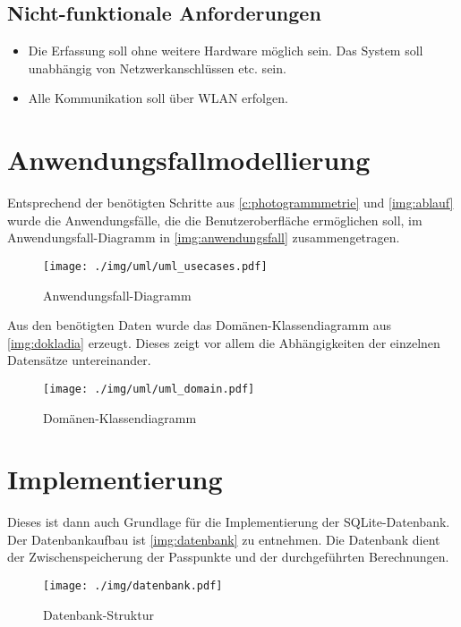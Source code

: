 \documentclass[./00_PhotoBox.tex]{subfiles}
\begin{document}
\subsection{Nicht-funktionale Anforderungen}
\begin{itemize}
    \item Die Erfassung soll ohne weitere Hardware möglich sein. Das System soll unabhängig von Netzwerkanschlüssen etc. sein.
    \item Alle Kommunikation soll über WLAN erfolgen.
\end{itemize}

\section{Anwendungsfallmodellierung}
\label{sec:Anwendungsfallmodellierung}

Entsprechend der benötigten Schritte aus \autoref{c:photogrammmetrie} und \autoref{img:ablauf} wurde die Anwendungsfälle, die die Benutzeroberfläche ermöglichen soll, im Anwendungsfall-Dia\-gramm in \autoref{img:anwendungsfall} zusammengetragen.

\begin{figure}[!htbp]
    \centering
    \texttt{[image: ./img/uml/uml\_usecases.pdf]}
    \centering
    \caption{Anwendungsfall-Diagramm} %
    \label{img:anwendungsfall} %
\end{figure}

Aus den benötigten Daten wurde das Domänen-Klassendiagramm aus \autoref{img:dokladia} erzeugt. Dieses zeigt vor allem die Abhängigkeiten der einzelnen Datensätze untereinander.

\begin{figure}[!htbp]
    \centering
    \texttt{[image: ./img/uml/uml\_domain.pdf]}
    \centering
    \caption{Domänen-Klassendiagramm} %
    \label{img:dokladia} %
\end{figure}

\section{Implementierung}
\label{sec:Implementierung}
Dieses ist dann auch Grundlage für die Implementierung der SQLite-Datenbank. Der Datenbankaufbau ist \autoref{img:datenbank} zu entnehmen. Die Datenbank dient der Zwischenspeicherung der Passpunkte und der durchgeführten Berechnungen.

\begin{figure}[!htbp]
    \centering
    \texttt{[image: ./img/datenbank.pdf]}
    \centering
    \caption{Datenbank-Struktur} %
    \label{img:datenbank} %
\end{figure}
\end{document}
